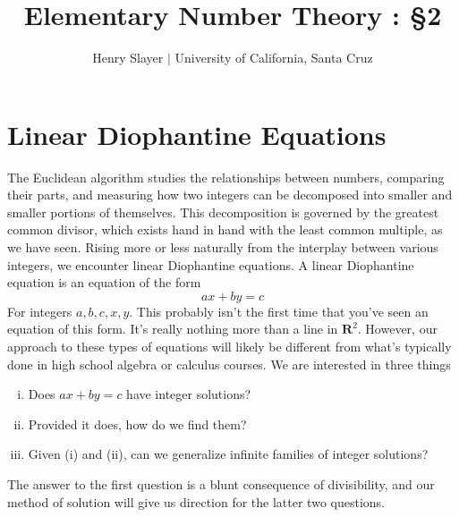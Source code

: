 \documentclass{article}
\begin{document}
 

\title{Elementary Number Theory : \S 2} 
\author{Henry Slayer $|$ University of California, Santa Cruz} 
\date{}
\maketitle

\section*{Linear Diophantine Equations} 
The Euclidean algorithm studies the relationships between numbers, comparing their parts, and measuring how two integers can be decomposed into smaller and smaller portions of themselves. This decomposition is governed by the greatest common divisor, which exists hand in hand with the least common multiple, as we have seen. Rising more or less naturally from the interplay between various integers, we encounter linear Diophantine equations. A linear Diophantine equation is an equation of the form 
\[ax + by = c\] 
For integers $a, b, c, x, y$. This probably isn't the first time that you've seen an equation of this form. It's really nothing more than a line in $\mathbf{R}^2$. However, our approach to these types of equations will likely be different from what's typically done in high school algebra or calculus courses. We are interested in three things 
\begin{enumerate}[(i)]
\item Does $ax + by = c$ have integer solutions? 
\item Provided it does, how do we find them? 
\item Given (i) and (ii), can we generalize infinite families of integer solutions? 
\end{enumerate} 
The answer to the first question is a blunt consequence of divisibility, and our method of solution will give us direction for the latter two questions. 
\end{document}
